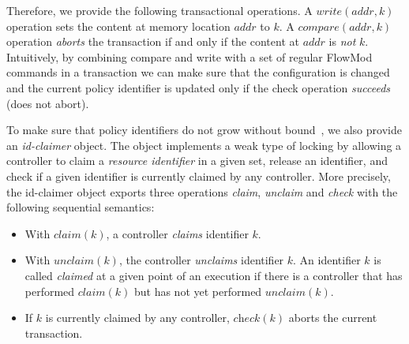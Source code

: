 \documentclass[conference]{sigcomm-alternate}
\newcommand{\Nat}{\mathbb{N}}
\newcommand{\claimcheck}{check\xspace}
\newcommand{\compare}{compare\xspace}
\newcommand{\addr}{\textit{addr}\xspace}
\begin{document}
Therefore, we provide the following transactional operations.
A $\textit{write}(\addr,k)$ operation sets the content at memory location
$\addr$ to $k$.
%
%
A $\textit{\compare}(\addr,k)$ operation \emph{aborts} the transaction
if and only if the content at
$\addr$ is \emph{not} $k$.
Intuitively, by combining compare and write with a set of regular
FlowMod commands in a transaction we can make sure that the
configuration is changed and the current policy identifier is updated
only if the check operation \emph{succeeds} (does not abort).

To make sure that policy identifiers do not grow without bound~\cite{stn}, we
also provide an \emph{id-claimer} object.
The object implements a weak type
of locking by allowing a controller to claim a \emph{resource identifier} in a
given set, release an identifier,  and check if a given identifier
is currently claimed by any controller.
%
More precisely, the id-claimer object exports three operations \emph{claim},
\emph{unclaim} and \emph{\claimcheck} with the following sequential
semantics:

\begin{itemize}
\item With $\textit{claim}(k)$,
a controller %
\emph{claims}  identifier $k$.

\item With $\textit{unclaim}(k)$, %
the controller %
  \emph{unclaims} identifier $k$.
An identifier $k$ is called \emph{claimed} at a given point of an
execution if there is a controller that has performed $\textit{claim}(k)$
but has not yet performed  $\textit{unclaim}(k)$.

\item If $k$ is currently claimed by any controller,
$\textit{\claimcheck}(k)$ %
aborts the current transaction.

\end{itemize}
\end{document}

